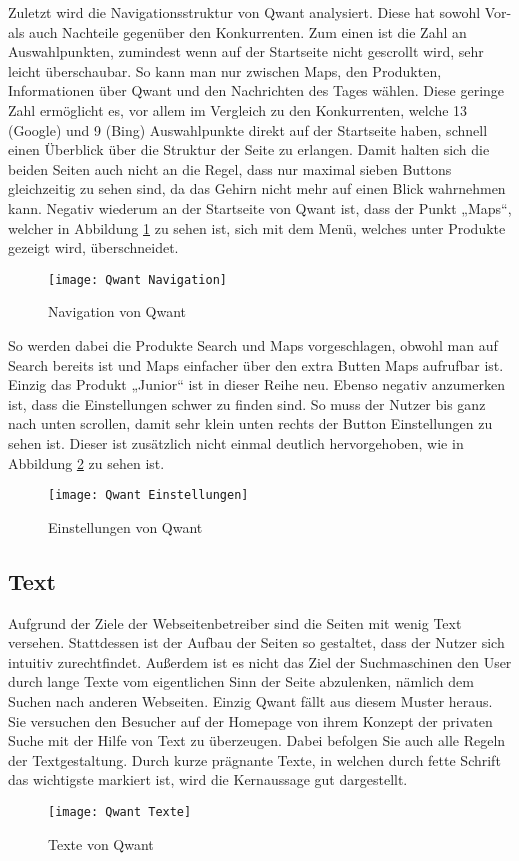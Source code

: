 Zuletzt wird die Navigationsstruktur von Qwant analysiert. Diese hat sowohl Vor- als auch Nachteile gegenüber den Konkurrenten.
Zum einen ist die Zahl an Auswahlpunkten, zumindest wenn auf der Startseite nicht gescrollt wird, sehr leicht überschaubar.
So kann man nur zwischen Maps, den Produkten, Informationen über Qwant und den Nachrichten des Tages wählen. Diese geringe
Zahl ermöglicht es, vor allem im Vergleich zu den Konkurrenten, welche 13 (Google) und 9 (Bing) Auswahlpunkte direkt auf der
Startseite haben, schnell einen Überblick über die Struktur der Seite zu erlangen. Damit halten sich die beiden Seiten auch
nicht an die Regel, dass nur maximal sieben Buttons gleichzeitig zu sehen sind, da das Gehirn nicht mehr auf einen Blick
wahrnehmen kann\cite[Seite 16]{Maulhardt.20220621b}. Negativ wiederum an der Startseite von Qwant ist, dass der Punkt „Maps“, welcher
in Abbildung \ref{fig:qwantnavigation} zu sehen ist, sich mit dem Menü, welches unter Produkte gezeigt wird, überschneidet.
\begin{figure}[h]
    \centering
    \texttt{[image: Qwant Navigation]}
    \caption{Navigation von Qwant}
    \label{fig:qwantnavigation}
\end{figure}

So werden dabei die
Produkte Search und Maps vorgeschlagen, obwohl man auf Search bereits ist und Maps einfacher über den extra Butten Maps
aufrufbar ist. Einzig das Produkt „Junior“ ist in dieser Reihe neu. Ebenso negativ anzumerken ist, dass die Einstellungen
schwer zu finden sind. So muss der Nutzer bis ganz nach unten scrollen, damit sehr klein unten rechts der Button Einstellungen
zu sehen ist. Dieser ist zusätzlich nicht einmal deutlich hervorgehoben, wie in Abbildung \ref{fig:qwanteinstellungen} zu sehen ist.
\begin{figure}[h]
    \centering
    \texttt{[image: Qwant Einstellungen]}
    \caption{Einstellungen von Qwant}
    \label{fig:qwanteinstellungen}
\end{figure}

\subsection{Text}
Aufgrund der Ziele der Webseitenbetreiber sind die Seiten mit wenig Text versehen. Stattdessen ist der Aufbau der Seiten
so gestaltet, dass der Nutzer sich intuitiv zurechtfindet. Außerdem ist es nicht das Ziel der Suchmaschinen den User durch
lange Texte vom eigentlichen Sinn der Seite abzulenken, nämlich dem Suchen nach anderen Webseiten. Einzig Qwant fällt aus
diesem Muster heraus. Sie versuchen den Besucher auf der Homepage von ihrem Konzept der privaten Suche mit der Hilfe von
Text zu überzeugen. Dabei befolgen Sie auch alle Regeln der Textgestaltung\cite[Seite 5ff]{Maulhardt.20220621b}. Durch kurze prägnante Texte,
in welchen durch fette Schrift das wichtigste markiert ist, wird die Kernaussage gut dargestellt.
\begin{figure}[h]
    \centering
    \texttt{[image: Qwant Texte]}
    \caption{Texte von Qwant}
\end{figure}

